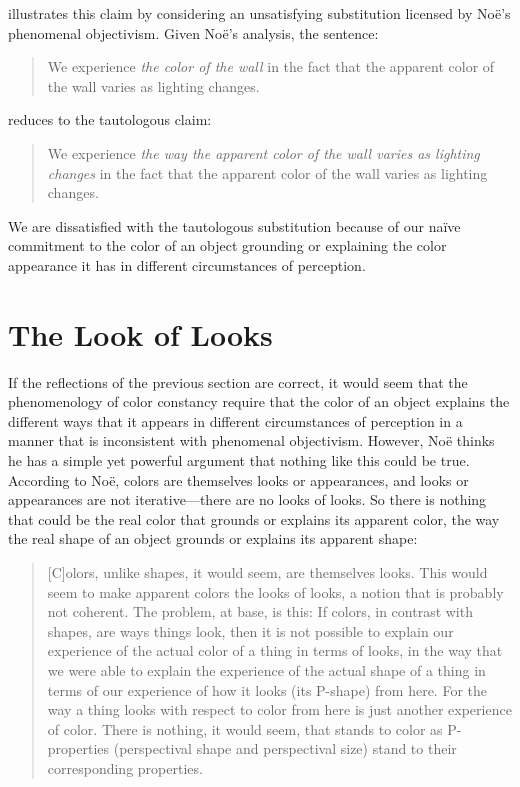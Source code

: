 \documentclass[12pt]{article}
\begin{document}
\citet{Allen:2008kx} illustrates this claim by considering an unsatisfying substitution licensed by Noë's phenomenal objectivism. Given Noë's analysis, the sentence:
	\begin{quote}
		We experience \emph{the color of the wall} in the fact that the apparent color of the wall varies as lighting changes.
	\end{quote}
reduces to the tautologous claim:
	\begin{quote}
		We experience \emph{the way the apparent color of the wall varies as lighting changes} in the fact that the apparent color of the wall varies as lighting changes.
	\end{quote}
We are dissatisfied with the tautologous substitution because of our naïve commitment to the color of an object grounding or explaining the color appearance it has in different circumstances of perception.


\section{The Look of Looks} %
\label{sec:the_look_of_looks}

If the reflections of the previous section are correct, it would seem that the phenomenology of color constancy require that the color of an object explains the different ways that it appears in different circumstances of perception in a manner that is inconsistent with phenomenal objectivism. However, Noë thinks he has a simple yet powerful argument that nothing like this could be true. According to Noë, colors are themselves looks or appearances, and looks or appearances are not iterative---there are no looks of looks. So there is nothing that could be the real color that grounds or explains its apparent color, the way the real shape of an object grounds or explains its apparent shape:
	\begin{quote}
		[C]olors, unlike shapes, it would seem, are themselves looks. This would seem to make apparent colors the looks of looks, a notion that is probably not coherent. The problem, at base, is this: If colors, in contrast with shapes, are ways things look, then it is not possible to explain our experience of the actual color of a thing in terms of looks, in the way that we were able to explain the experience of the actual shape of a thing in terms of our experience of how it looks (its P-shape) from here. For the way a thing looks with respect to color from here is just another experience of color. There is nothing, it would seem, that stands to color as P-properties (perspectival shape and perspectival size) stand to their corresponding properties. \citep[133]{Noe:2004fk}
	\end{quote}
\end{document}

